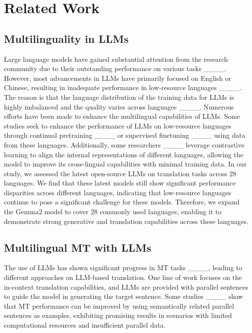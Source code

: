 \section{Related Work}
\subsection{Multilinguality in LLMs}

Large language models have gained substantial attention from the research community due to their outstanding performance on various tasks ____. However, most advancements in LLMs have primarily focused on English or Chinese, resulting in inadequate performance in low-resource languages ____. The reason is that the language distribution of the training data for LLMs is highly imbalanced and the quality varies across languages ____. Numerous efforts have been made to enhance the multilingual capabilities of LLMs. Some studies seek to enhance the performance of LLMs on low-resource languages through continual pretraining ____ or supervised finetuning ____ using data from these languages. Additionally, some researchers ____ leverage contrastive learning to align the internal representations of different languages, allowing the model to improve its cross-lingual capabilities with minimal training data. In our study, we assessed the latest open-source LLMs on translation tasks across $28$ languages. We find that these latest models still show significant performance disparities across different languages, indicating that low-resource languages continue to pose a significant challenge for these models. Therefore, we expand the Gemma2 model to cover $28$ commonly used languages, enabling it to demonstrate strong generative and translation capabilities across these languages.

\subsection{Multilingual MT with LLMs}

The use of LLMs has shown significant progress in MT tasks ____, leading to different approaches on LLM-based translation. One line of work focuses on the in-context translation capabilities, and LLMs are provided with parallel sentences to guide the model in generating the target sentence. Some studies ____ show that MT performance can be improved by using semantically related parallel sentences as examples, exhibiting promising results in scenarios with limited computational resources and insufficient parallel data.

